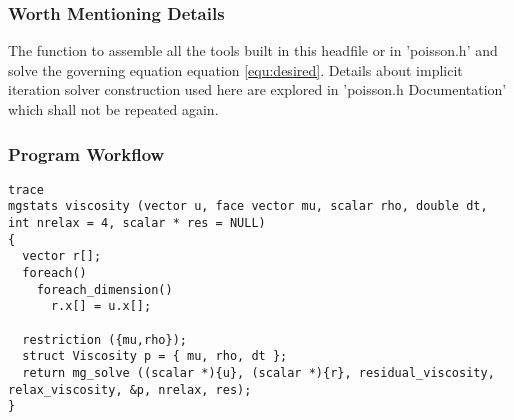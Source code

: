 \documentclass[a4paper]{article}
\newcommand{\func}[1]{\textbf{\textcolor{function}{#1}}}
\newcommand{\para}[1]{\textbf{\emph{\textcolor{para}{#1}}}}
\begin{document}
\subsubsection{Worth Mentioning Details}
The function to assemble all the tools built in this headfile or in 'poisson.h' and solve the governing equation equation \ref{equ:desired}. Details about implicit iteration solver construction used here are explored in 'poisson.h Documentation' which shall not be repeated again.

\subsubsection{Program Workflow}
\begin{multicols}{2}
  \columnbreak
  \begin{verbatim}
trace
mgstats viscosity (vector u, face vector mu, scalar rho, double dt, int nrelax = 4, scalar * res = NULL)
{
  vector r[];
  foreach()
    foreach_dimension()
      r.x[] = u.x[];

  restriction ({mu,rho});
  struct Viscosity p = { mu, rho, dt };
  return mg_solve ((scalar *){u}, (scalar *){r}, residual_viscosity, relax_viscosity, &p, nrelax, res);
}
  \end{verbatim}
\end{multicols}
\end{document}
